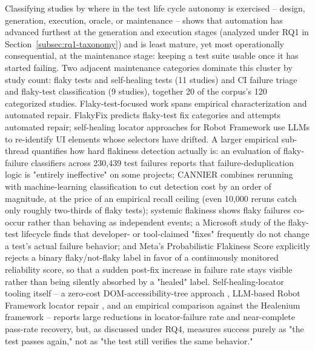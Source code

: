 Classifying studies by where in the test life cycle autonomy is
exercised -- design, generation, execution, oracle, or
maintenance -- shows that automation has advanced furthest at the
generation and execution stages (analyzed under RQ1 in
Section~\ref{subsec:rq1-taxonomy}) and is least mature, yet
most operationally consequential, at the maintenance stage: keeping a
test suite usable once it has started failing. Two adjacent
maintenance categories dominate this cluster by study count: flaky
tests and self-healing tests (11 studies) and CI failure triage and
flaky-test classification (9 studies), together 20 of the corpus's 120
categorized studies. Flaky-test-focused work spans empirical
characterization and automated repair. FlakyFix \cite{fatima2025}
predicts flaky-test fix categories and attempts automated repair;
self-healing locator approaches for Robot Framework
\cite{h2nd,h32026} use LLMs to re-identify UI elements whose
selectors have drifted. A larger empirical sub-thread quantifies how
hard flakiness detection actually is: an evaluation of flaky-failure
classifiers across 230,439 test failures \cite{alshammari2024flakyclassifiers}
reports that failure-deduplication logic is "entirely ineffective" on
some projects; CANNIER \cite{parry2023cannier} combines rerunning with
machine-learning classification to cut detection cost by an order of
magnitude, at the price of an empirical recall ceiling (even 10,000
reruns catch only roughly two-thirds of flaky tests); systemic
flakiness \cite{parry2025systemic} shows flaky failures co-occur
rather than behaving as independent events; a Microsoft study of the
flaky-test lifecycle \cite{lam2020lifecycle} finds that developer- or
tool-claimed "fixes" frequently do not change a test's actual failure
behavior; and Meta's Probabilistic Flakiness Score
\cite{meta2020pfs} explicitly rejects a binary flaky/not-flaky label
in favor of a continuously monitored reliability score, so that a
sudden post-fix increase in failure rate stays visible rather than
being silently absorbed by a "healed" label. Self-healing-locator
tooling itself -- a zero-cost DOM-accessibility-tree approach
\cite{joseph2026zerocost}, LLM-based Robot Framework locator repair
\cite{rohamo2024robotframework}, and an empirical comparison against
the Healenium framework \cite{ijam2025healenium} -- reports large
reductions in locator-failure rate and near-complete pass-rate
recovery, but, as discussed under RQ4, measures success purely as
"the test passes again," not as "the test still verifies the same
behavior."


